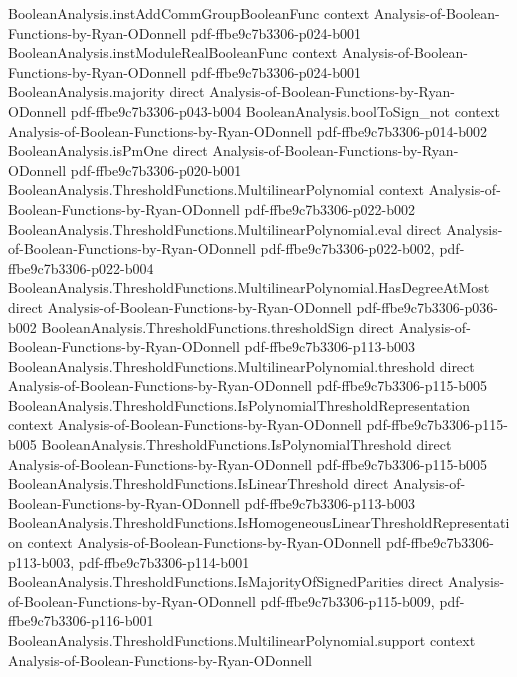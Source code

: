 \begin{theorem}
  {BooleanAnalysis.instAddCommGroupBooleanFunc}
  {context}
  {Analysis-of-Boolean-Functions-by-Ryan-ODonnell}
  {pdf-ffbe9c7b3306-p024-b001}
\proofstep
  {BooleanAnalysis.instModuleRealBooleanFunc}
  {context}
  {Analysis-of-Boolean-Functions-by-Ryan-ODonnell}
  {pdf-ffbe9c7b3306-p024-b001}
\proofstep
  {BooleanAnalysis.majority}
  {direct}
  {Analysis-of-Boolean-Functions-by-Ryan-ODonnell}
  {pdf-ffbe9c7b3306-p043-b004}
\proofstep
  {BooleanAnalysis.boolToSign_not}
  {context}
  {Analysis-of-Boolean-Functions-by-Ryan-ODonnell}
  {pdf-ffbe9c7b3306-p014-b002}
\proofstep
  {BooleanAnalysis.isPmOne}
  {direct}
  {Analysis-of-Boolean-Functions-by-Ryan-ODonnell}
  {pdf-ffbe9c7b3306-p020-b001}
\proofstep
  {BooleanAnalysis.ThresholdFunctions.MultilinearPolynomial}
  {context}
  {Analysis-of-Boolean-Functions-by-Ryan-ODonnell}
  {pdf-ffbe9c7b3306-p022-b002}
\proofstep
  {BooleanAnalysis.ThresholdFunctions.MultilinearPolynomial.eval}
  {direct}
  {Analysis-of-Boolean-Functions-by-Ryan-ODonnell}
  {pdf-ffbe9c7b3306-p022-b002,
    pdf-ffbe9c7b3306-p022-b004}
\proofstep
  {BooleanAnalysis.ThresholdFunctions.MultilinearPolynomial.HasDegreeAtMost}
  {direct}
  {Analysis-of-Boolean-Functions-by-Ryan-ODonnell}
  {pdf-ffbe9c7b3306-p036-b002}
\proofstep
  {BooleanAnalysis.ThresholdFunctions.thresholdSign}
  {direct}
  {Analysis-of-Boolean-Functions-by-Ryan-ODonnell}
  {pdf-ffbe9c7b3306-p113-b003}
\proofstep
  {BooleanAnalysis.ThresholdFunctions.MultilinearPolynomial.threshold}
  {direct}
  {Analysis-of-Boolean-Functions-by-Ryan-ODonnell}
  {pdf-ffbe9c7b3306-p115-b005}
\proofstep
  {BooleanAnalysis.ThresholdFunctions.IsPolynomialThresholdRepresentation}
  {context}
  {Analysis-of-Boolean-Functions-by-Ryan-ODonnell}
  {pdf-ffbe9c7b3306-p115-b005}
\proofstep
  {BooleanAnalysis.ThresholdFunctions.IsPolynomialThreshold}
  {direct}
  {Analysis-of-Boolean-Functions-by-Ryan-ODonnell}
  {pdf-ffbe9c7b3306-p115-b005}
\proofstep
  {BooleanAnalysis.ThresholdFunctions.IsLinearThreshold}
  {direct}
  {Analysis-of-Boolean-Functions-by-Ryan-ODonnell}
  {pdf-ffbe9c7b3306-p113-b003}
\proofstep
  {BooleanAnalysis.ThresholdFunctions.IsHomogeneousLinearThresholdRepresentation}
  {context}
  {Analysis-of-Boolean-Functions-by-Ryan-ODonnell}
  {pdf-ffbe9c7b3306-p113-b003,
    pdf-ffbe9c7b3306-p114-b001}
\proofstep
  {BooleanAnalysis.ThresholdFunctions.IsMajorityOfSignedParities}
  {direct}
  {Analysis-of-Boolean-Functions-by-Ryan-ODonnell}
  {pdf-ffbe9c7b3306-p115-b009,
    pdf-ffbe9c7b3306-p116-b001}
\proofstep
  {BooleanAnalysis.ThresholdFunctions.MultilinearPolynomial.support}
  {context}
  {Analysis-of-Boolean-Functions-by-Ryan-ODonnell}

\end{theorem}
